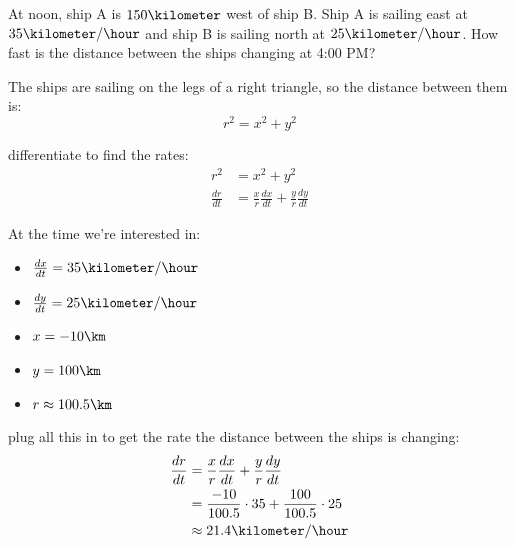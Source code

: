 \documentclass[fleqn,addpoints]{exam}
\begin{document}
\begin{questions}
\begin{solution}
\end{solution}

\question
At noon, ship A is $150 \kilometer$ west of ship B.  Ship A is sailing east at $35 \kilometer / \hour$ and ship B is
sailing north at $25 \kilometer / \hour$.  How fast is the distance between the ships changing at 4:00 PM?

\begin{solution}
The ships are sailing on the legs of a right triangle, so the distance between them is:
\[
  r^2 = x^2 + y^2
\]

differentiate to find the rates:
\begin{align*}
  r^2 &= x^2 + y^2 \\
  \frac{dr}{dt} &= \frac{x}{r} \frac{dx}{dt} + \frac{y}{r} \frac{dy}{dt}
\end{align*}

At the time we're interested in:
\begin{itemize}
\item $\frac{dx}{dt} = 35 \kilometer / \hour$
\item $\frac{dy}{dt} = 25 \kilometer / \hour$
\item $x = -10 \km$
\item $y = 100 \km$
\item $r \approx 100.5 \km$
\end{itemize}

plug all this in to get the rate the distance between the ships is changing:
\begin{align*}
  \frac{dr}{dt} &= \frac{x}{r} \frac{dx}{dt} + \frac{y}{r} \frac{dy}{dt}  \\
     &= \frac{-10}{100.5} \cdot 35 + \frac{100}{100.5} \cdot 25 \\
     &\approx 21.4 \kilometer / \hour \\
\end{align*}

\end{solution}

\end{questions}
\end{document}

